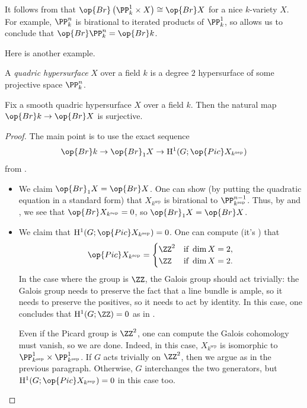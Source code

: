 \documentclass[../notes.tex]{subfiles}
\begin{document}
\begin{example} \label{ex:br-pn}
	It follows from  that $\op{Br}\left(\PP^1_k\times X\right)\cong\op{Br}X$ for a nice $k$-variety $X$. For example, $\PP^n_k$ is birational to iterated products of $\PP^1_k$, so  allows us to conclude that $\op{Br}\PP^n_k=\op{Br}k$.
\end{example}
Here is another example.
\begin{definition}[quadric]
	A \textit{quadric hypersurface} $X$ over a field $k$ is a degree $2$ hypersurface of some projective space $\PP^n_k$.
\end{definition}
\begin{proposition} \label{prop:br-quadric-hypersurface}
	Fix a smooth quadric hypersurface $X$ over a field $k$. Then the natural map $\op{Br}k\to\op{Br}X$ is surjective.
\end{proposition}
\begin{proof}
	The main point is to use the exact sequence
	\[\op{Br}k\to\op{Br}_1X\to\mathrm H^1(G;\op{Pic}X_{k^{\mathrm{sep}}})\]
	from .
	\begin{itemize}
		\item We claim $\op{Br}_1X=\op{Br}X$. One can show (by putting the quadratic equation in a standard form) that $X_{k^{\mathrm{sep}}}$ is birational to $\PP^{n-1}_{k^{\mathrm{sep}}}$. Thus, by  and , we see that $\op{Br}X_{k^{\mathrm{sep}}}=0$, so $\op{Br}_1X=\op{Br}X$.
		\item We claim that $\mathrm H^1(G;\op{Pic}X_{k^{\mathrm{sep}}})=0$. One can compute (it's \cite[Exercise~II.6.5]{hartshorne}) that
		\[\op{Pic}X_{k^{\mathrm{sep}}}=\begin{cases}
			\ZZ^2 & \text{if }\dim X=2, \\
			\ZZ & \text{if }\dim X=2.
		\end{cases}\]
		In the case where the group is $\ZZ$, the Galois group should act trivially: the Galois group needs to preserve the fact that a line bundle is ample, so it needs to preserve the positives, so it needs to act by identity. In this case, one concludes that $\mathrm H^1(G;\ZZ)=0$ as in .
		
		Even if the Picard group is $\ZZ^2$, one can compute the Galois cohomology must vanish, so we are done. Indeed, in this case, $X_{k^{\mathrm{sep}}}$ is isomorphic to $\PP^1_{k^{\mathrm{sep}}}\times\PP^1_{k^{\mathrm{sep}}}$. If $G$ acts trivially on $\ZZ^2$, then we argue as in the previous paragraph. Otherwise, $G$ interchanges the two generators, but $\mathrm H^1(G;\op{Pic}X_{k^{\mathrm{sep}}})=0$ in this case too.
		\qedhere
	\end{itemize}
\end{proof}
\end{document}
